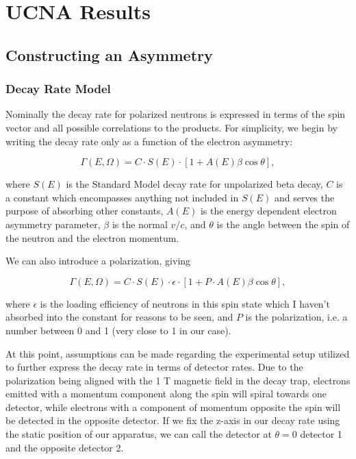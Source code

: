 \chapter{UCNA Results}
\label{ch:UCNA_Results}


\section{Constructing an Asymmetry}

\subsection{Decay Rate Model}
Nominally the decay rate for polarized neutrons is expressed in terms of the spin
vector and all possible correlations to the products. For simplicity,
we begin by writing the decay rate only as a function of the
electron asymmetry: 

\begin{equation} \label{eq:simpleRate}
\Gamma\left(E,\Omega\right)=C \cdot S(E) \cdot \left[ 1+A(E)\beta\cos\theta \right],
\end{equation}

\noindent where $S(E)$ is the Standard Model decay rate for unpolarized beta decay, $C$
is a constant which encompasses anything not included in $S(E)$ and serves the 
purpose of absorbing other constants, $A(E)$ is the 
energy dependent electron asymmetry parameter, $\beta$ is the normal $v/c$, and 
$\theta$ is the angle between the spin of the neutron and the electron momentum.

We can also introduce a polarization, giving

\begin{equation}
\Gamma\left(E,\Omega\right)=C \cdot S(E) \cdot \epsilon \cdot \left[ 1+ P\cdot A(E)\beta\cos\theta \right],
\end{equation}

\noindent where $\epsilon$ is the loading efficiency of neutrons in this spin state which I haven't absorbed
into the constant for reasons to be seen, and 
$P$ is the polarization, i.e. a number between 0 and 1 (very close to 1
in our case).

At this point, assumptions can be made regarding the experimental setup utilized
to further express the decay rate in terms of detector rates. Due to the polarization
being aligned with the 1 T magnetic field in the decay trap, electrons emitted with
a momentum component along the spin will spiral towards one detector, while electrons
with a component of momentum opposite the spin will be detected in the opposite 
detector. If we fix the z-axis in our decay rate using the static position of our
apparatus, we can call the detector at $\theta=0$ detector
1 and the opposite detector 2. 

